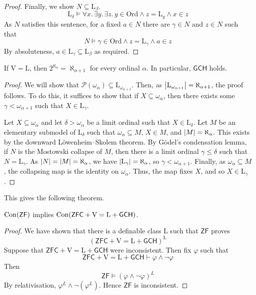 \begin{proof}
    Finally, we show \( N \subseteq \mathrm{L}_\beta \).
    \[ \mathrm{L}_\delta \vDash \forall x.\, \exists y.\, \exists z.\, y \in \mathrm{Ord} \wedge z = \mathrm{L}_y \wedge x \in z \]
    As \( N \) satisfies this sentence, for a fixed \( a \in N \) there are \( \gamma \in N \) and \( z \in N \) such that
    \[ N \vDash \gamma \in \mathrm{Ord} \wedge z = \mathrm{L}_\gamma \wedge a \in z \]
    By absoluteness, \( a \in \mathrm{L}_\gamma \subseteq \mathrm{L}_\beta \) as required.
\end{proof}
\begin{theorem}
    If \( \mathrm{V} = \mathrm{L} \), then \( 2^{\aleph_\alpha} = \aleph_{\alpha + 1} \) for every ordinal \( \alpha \).
    In particular, \( \mathsf{GCH} \) holds.
\end{theorem}
\begin{proof}
    We will show that \( \mathcal P(\omega_\alpha) \subseteq \mathrm{L}_{\omega_{\alpha + 1}} \).
    Then, as \( \abs{\mathrm{L}_{\omega_{\alpha + 1}}} = \aleph_{\alpha + 1} \), the proof follows.
    To do this, it suffices to show that if \( X \subseteq \omega_\alpha \), then there exists some \( \gamma < \omega_{\alpha + 1} \) such that \( X \in \mathrm{L}_\gamma \).

    Let \( X \subseteq \omega_\alpha \) and let \( \delta > \omega_\alpha \) be a limit ordinal such that \( X \in \mathrm{L}_\delta \).
    Let \( M \) be an elementary submodel of \( \mathrm{L}_\delta \) such that \( \omega_\alpha \subseteq M \), \( X \in M \), and \( \abs{M} = \aleph_\alpha \).
    This exists by the downward L\"owenheim--Skolem theorem.
    By G\"odel's condensation lemma, if \( N \) is the Mostowski collapse of \( M \), then there is a limit ordinal \( \gamma \leq \delta \) such that \( N = \mathrm{L}_\gamma \).
    As \( \abs{N} = \abs{M} = \aleph_\alpha \), we have \( \abs{\mathrm{L}_\gamma} = \aleph_\alpha \), so \( \gamma < \omega_{\alpha + 1} \).
    Finally, as \( \omega_\alpha \subseteq M \), the collapsing map is the identity on \( \omega_\alpha \).
    Thus, the map fixes \( X \), and so \( X \in \mathrm{L}_\gamma \).
\end{proof}
This gives the following theorem.
\begin{theorem}
    \( \operatorname{Con}(\mathsf{ZF}) \) implies \( \operatorname{Con}(\mathsf{ZFC} + \mathrm{V} = \mathrm{L} + \mathsf{GCH}) \).
\end{theorem}
\begin{proof}
    We have shown that there is a definable class \( \mathrm{L} \) such that \( \mathsf{ZF} \) proves
    \[ (\mathsf{ZFC} + \mathrm{V} = \mathrm{L} + \mathsf{GCH})^{\mathrm{L}} \]
    Suppose that \( \mathsf{ZFC} + \mathrm{V} = \mathrm{L} + \mathsf{GCH} \) were inconsistent.
    Then fix \( \varphi \) such that
    \[ \mathsf{ZFC} + \mathrm{V} = \mathrm{L} + \mathsf{GCH} \vdash \varphi \wedge \neg\varphi \]
    Then
    \[ \mathsf{ZF} \vDash (\varphi \wedge \neg\varphi)^L \]
    By relativisation, \( \varphi^L \wedge \neg(\varphi^L) \).
    Hence \( \mathsf{ZF} \) is inconsistent.
\end{proof}
